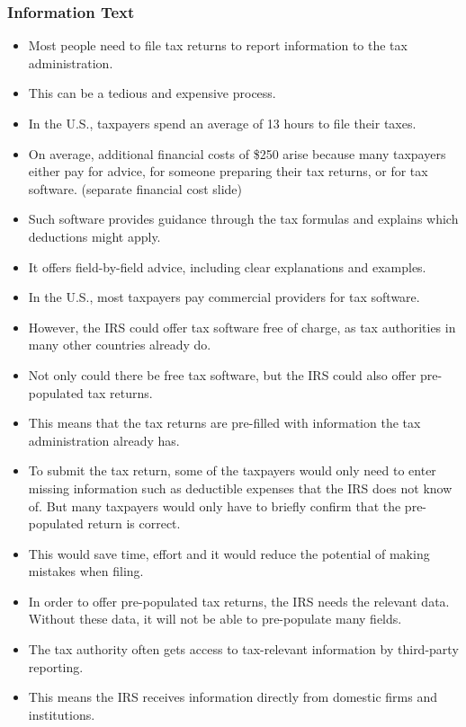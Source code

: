 \documentclass[11pt]{article}
\begin{document}
\subsubsection*{Information Text}
\begin{itemize}
    \item Most people need to file tax returns to report information to the tax administration. 
    \item This can be a tedious and expensive process.
    \item In the U.S., taxpayers spend an average of 13 hours to file their taxes.
    \item On average, additional financial costs of \$250 arise because many taxpayers either pay for advice, for someone preparing their tax returns, or for tax software. (separate financial cost slide)
    \item Such software provides guidance through the tax formulas and explains which deductions might apply.
    \item It offers field-by-field advice, including clear explanations and examples. 
    \item In the U.S., most taxpayers pay commercial providers for tax software.
    \item However, the IRS could offer tax software free of charge, as tax authorities in many other countries already do.
    \item Not only could there be free tax software, but the IRS could also offer pre-populated tax returns. 
    \item This means that the tax returns are pre-filled with information the tax administration already has.
    \item To submit the tax return, some of the taxpayers would only need to enter missing information such as deductible expenses that the IRS does not know of. But many taxpayers would only have to briefly confirm that the pre-populated return is correct.
    \item This would save time, effort and it would reduce the potential of making mistakes when filing. 
    \item In order to offer pre-populated tax returns, the IRS needs the relevant data. Without these data, it will not be able to pre-populate many fields. 
    \item The tax authority often gets access to tax-relevant information by third-party reporting. 
    \item This means the IRS receives information directly from domestic firms and institutions. 

\end{itemize}
\end{document}
